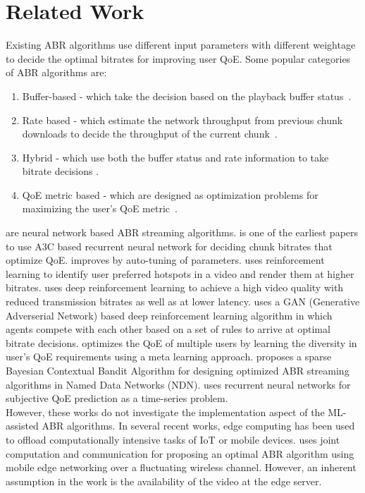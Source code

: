 \section{Related Work}\label{sec:chap05:related_work}
Existing ABR algorithms use different input parameters with different weightage to decide the optimal bitrates for improving user QoE. Some popular categories of \ac{ABR} algorithms are: 
\begin{enumerate}
    \item Buffer-based - which take the decision based on the playback buffer status~\cite{Spiteri2016,Huang2014}.
    \item Rate based - which estimate the network throughput from  previous chunk downloads to decide the throughput of the current chunk~\cite{Jiang2014,Xu2015}.
    \item Hybrid - which use both the buffer status and rate information to take bitrate decisions \cite{Zou2015}.
    \item QoE metric based - which are designed as  optimization problems for maximizing the user's QoE metric~\cite{Yin2015,Qin2018,Qin2019,Mao2017,Akhtar2018}.
\end{enumerate} 
\cite{Mao2017,Akhtar2018,Sengupta2018,Bampis2018,8816854,Huang2019} are neural network based \ac{ABR} streaming algorithms.  \cite{Mao2017} is one of the earliest papers to use A3C based recurrent neural network for deciding chunk bitrates that optimize QoE. \cite{Akhtar2018} improves \cite{Mao2017} by auto-tuning of parameters. \cite{Sengupta2018} uses reinforcement learning to identify user preferred hotspots in a video and render them at higher bitrates. \cite{Huang2018} uses deep reinforcement learning to achieve a high video quality with reduced transmission bitrates as well as at lower latency. \cite{Huang2019} uses a GAN (Generative Adverserial Network) based deep reinforcement learning algorithm in which agents compete with each other based on a set of rules to arrive at optimal bitrate decisions. \cite{Huo2019} optimizes the QoE of multiple users by learning the diversity in user's QoE requirements using a meta learning approach. \cite{Alt2019} proposes a sparse Bayesian Contextual Bandit Algorithm for designing optimized ABR streaming algorithms in Named Data Networks (NDN). \cite{Bampis2018} uses recurrent neural networks for subjective QoE prediction as a time-series problem.\\
\indent However, these works do not investigate the implementation aspect of the ML-assisted ABR algorithms. In several recent works, edge computing has been used to offload computationally intensive tasks  of IoT or mobile devices. \cite{Guo2019} uses joint computation and communication for proposing an optimal ABR algorithm using mobile edge networking over a fluctuating wireless channel. However, an inherent assumption in the work is the availability of the video at the edge server.\\
